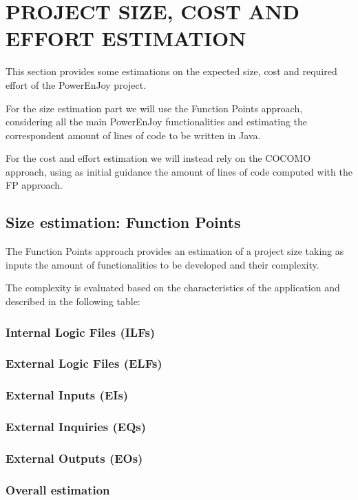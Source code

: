 \section{PROJECT SIZE, COST AND EFFORT ESTIMATION}
This section provides some estimations on the expected size, cost and required effort of the PowerEnJoy project.

For the size estimation part we will use the Function Points approach, considering all the main PowerEnJoy functionalities and estimating the correspondent amount of lines of code to be written in Java. 

For the cost and effort estimation we will instead rely on the COCOMO approach, using as initial guidance the amount of lines of code computed with the FP approach.

\subsection{Size estimation: Function Points}
The Function Points approach provides an estimation of a project size taking as inputs the amount of functionalities to be developed and their complexity.

The complexity is evaluated based on the characteristics of the application and described in the following table:


\subsubsection{Internal Logic Files (ILFs)}

\subsubsection{External Logic Files (ELFs)}

\subsubsection{External Inputs (EIs)} 

\subsubsection{External Inquiries (EQs)}

\subsubsection{External Outputs (EOs)} 

\subsubsection{Overall estimation}

